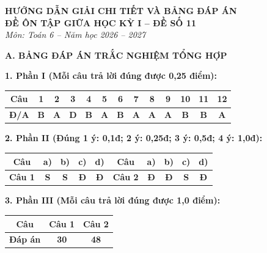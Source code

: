 \documentclass[12pt,a4paper]{article}
\begin{document}
\begin{center}
  \textbf{\Large HƯỚNG DẪN GIẢI CHI TIẾT VÀ BẢNG ĐÁP ÁN}\\
  \textbf{\large ĐỀ ÔN TẬP GIỮA HỌC KỲ I -- ĐỀ SỐ 11}\\
  \textit{Môn: Toán 6 -- Năm học 2026 -- 2027}
\end{center}
\vspace{2mm}

\noindent\textbf{\large A. BẢNG ĐÁP ÁN TRẮC NGHIỆM TỔNG HỢP}
\vspace{1.5mm}

\noindent\textbf{1. Phần I (Mỗi câu trả lời đúng được 0,25 điểm):}
\begin{center}
\begin{tabular}{|c|c|c|c|c|c|c|c|c|c|c|c|c|}
\hline
\textbf{Câu} & \textbf{1} & \textbf{2} & \textbf{3} & \textbf{4} & \textbf{5} & \textbf{6} & \textbf{7} & \textbf{8} & \textbf{9} & \textbf{10} & \textbf{11} & \textbf{12} \\
\hline
\textbf{Đ/A} & \textbf{B} & \textbf{A} & \textbf{D} & \textbf{B} & \textbf{A} & \textbf{B} & \textbf{A} & \textbf{A} & \textbf{A} & \textbf{B} & \textbf{B} & \textbf{A} \\
\hline
\end{tabular}
\end{center}
\vspace{1mm}

\noindent\textbf{2. Phần II (Đúng 1 ý: 0,1đ; 2 ý: 0,25đ; 3 ý: 0,5đ; 4 ý: 1,0đ):}
\begin{center}
\begin{tabular}{|c|c|c|c|c||c|c|c|c|c|}
\hline
\textbf{Câu} & \textbf{a)} & \textbf{b)} & \textbf{c)} & \textbf{d)} & \textbf{Câu} & \textbf{a)} & \textbf{b)} & \textbf{c)} & \textbf{d)} \\
\hline
\textbf{Câu 1} & \textbf{S} & \textbf{S} & \textbf{Đ} & \textbf{Đ} & \textbf{Câu 2} & \textbf{Đ} & \textbf{Đ} & \textbf{S} & \textbf{Đ} \\
\hline
\end{tabular}
\end{center}
\vspace{1mm}

\noindent\textbf{3. Phần III (Mỗi câu trả lời đúng được 1,0 điểm):}
\begin{center}
\begin{tabular}{|c|c|c|}
\hline
\textbf{Câu} & \textbf{Câu 1} & \textbf{Câu 2} \\
\hline
\textbf{Đáp án} & \textbf{30} & \textbf{48} \\
\hline
\end{tabular}
\end{center}
\vspace{3mm}
\end{document}
